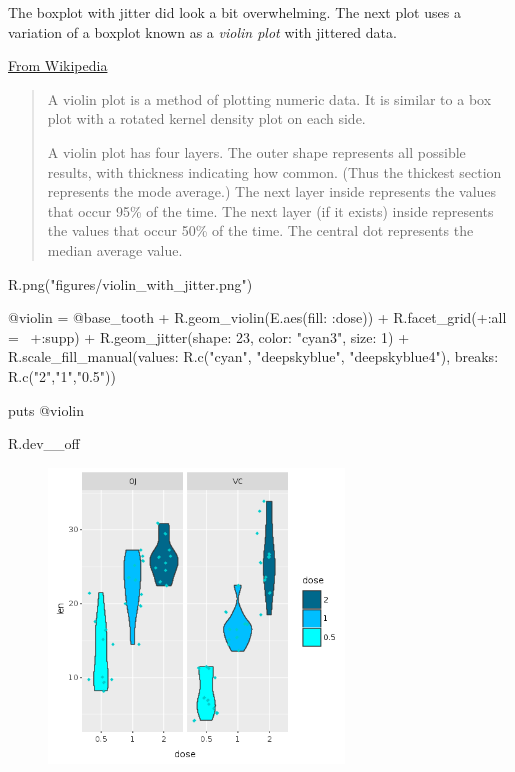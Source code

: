 \documentclass[11pt,]{article}
\newenvironment{Shaded}{\begin{snugshade}}{\end{snugshade}}
\newcommand{\DecValTok}[1]{\textcolor[rgb]{0.00,0.00,0.81}{#1}}
\newcommand{\StringTok}[1]{\textcolor[rgb]{0.31,0.60,0.02}{#1}}
\newcommand{\OtherTok}[1]{\textcolor[rgb]{0.56,0.35,0.01}{#1}}
\newcommand{\NormalTok}[1]{#1}
\begin{document}
The boxplot with jitter did look a bit overwhelming. The next plot uses
a variation of a boxplot known as a \emph{violin plot} with jittered
data.

\href{https://en.wikipedia.org/wiki/Violin_plot}{From Wikipedia}

\begin{quote}
A violin plot is a method of plotting numeric data. It is similar to a
box plot with a rotated kernel density plot on each side.

A violin plot has four layers. The outer shape represents all possible
results, with thickness indicating how common. (Thus the thickest
section represents the mode average.) The next layer inside represents
the values that occur 95\% of the time. The next layer (if it exists)
inside represents the values that occur 50\% of the time. The central
dot represents the median average value.
\end{quote}

\begin{Shaded}
\begin{Highlighting}[]
\NormalTok{R.png(}\StringTok{"figures/violin_with_jitter.png"}\NormalTok{)}

\OtherTok{@violin}\NormalTok{ = }\OtherTok{@base_tooth}\NormalTok{ + R.geom_violin(E.aes(}\StringTok{fill: :dose}\NormalTok{)) + }
\NormalTok{   R.facet_grid(+}\StringTok{:all}\NormalTok{ =~ +}\StringTok{:supp}\NormalTok{) +}
\NormalTok{   R.geom_jitter(}\StringTok{shape: }\DecValTok{23}\NormalTok{, }\StringTok{color: "cyan3"}\NormalTok{, }\StringTok{size: }\DecValTok{1}\NormalTok{) +}
\NormalTok{   R.scale_fill_manual(}\StringTok{values: }\NormalTok{R.c(}\StringTok{"cyan"}\NormalTok{, }\StringTok{"deepskyblue"}\NormalTok{, }\StringTok{"deepskyblue4"}\NormalTok{),}
                       \StringTok{breaks: }\NormalTok{R.c(}\StringTok{"2"}\NormalTok{,}\StringTok{"1"}\NormalTok{,}\StringTok{"0.5"}\NormalTok{))}

\NormalTok{puts }\OtherTok{@violin}

\NormalTok{R.dev__off}
\end{Highlighting}
\end{Shaded}

\begin{figure}
\centering
\includegraphics[width=0.70000\textwidth]{figures/violin_with_jitter.png}
\caption{}
\end{figure}
\end{document}
